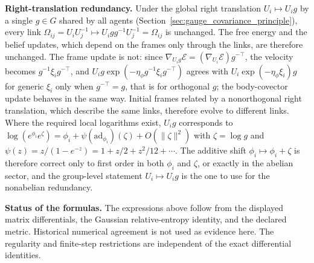 \textbf{Right-translation redundancy.} Under the global right translation $U_i \mapsto U_i g$ by a single $g \in G$ shared by all agents (Section~\ref{sec:gauge_covariance_principle}), every link $\Omega_{ij} = U_iU_j^{-1} \mapsto U_i g g^{-1} U_j^{-1} = \Omega_{ij}$ is unchanged. The free energy and the belief updates, which depend on the frames only through the links, are therefore unchanged. The frame update is not: since $\nabla_{U_ig}\mathcal{E} = (\nabla_{U_i}\mathcal{E})g^{-\top}$, the velocity becomes $g^{-1}\xi_i g^{-\top}$, and $U_ig\exp(-\eta_\phi g^{-1}\xi_ig^{-\top})$ agrees with $U_i\exp(-\eta_\phi\xi_i)g$ for generic $\xi_i$ only when $g^{-\top} = g$, that is for orthogonal $g$; the body-covector update behaves in the same way. Initial frames related by a nonorthogonal right translation, which describe the same links, therefore evolve to different links. Where the required local logarithms exist, $U_ig$ corresponds to $\log(e^{\phi_i}e^{\zeta}) = \phi_i + \psi(\mathrm{ad}_{\phi_i})(\zeta) + O(\|\zeta\|^2)$ with $\zeta = \log g$ and $\psi(z) = z/(1 - e^{-z}) = 1 + z/2 + z^2/12 + \cdots$. The additive shift $\phi_i \mapsto \phi_i + \zeta$ is therefore correct only to first order in both $\phi_i$ and $\zeta$, or exactly in the abelian sector, and the group-level statement $U_i \mapsto U_i g$ is the one to use for the nonabelian redundancy.

\textbf{Status of the formulas.} The expressions above follow from the displayed matrix differentials, the Gaussian relative-entropy identity, and the declared metric. Historical numerical agreement is not used as evidence here. The regularity and finite-step restrictions are independent of the exact differential identities.

